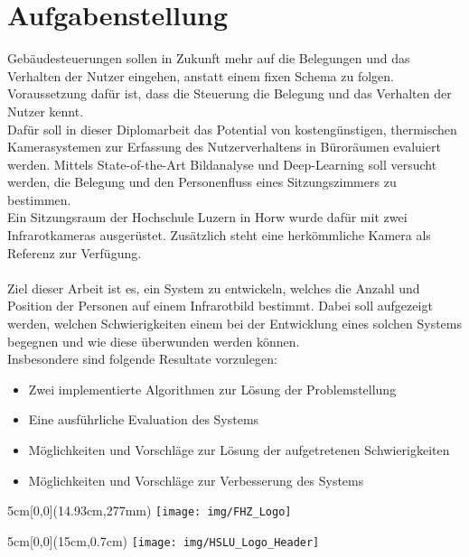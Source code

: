 \documentclass[
	a4paper
]{scrartcl}
\begin{document}
\section{Aufgabenstellung}
Gebäudesteuerungen sollen in Zukunft mehr auf die Belegungen und das Verhalten der Nutzer eingehen, anstatt einem fixen Schema zu folgen. Voraussetzung dafür ist, dass die Steuerung die Belegung und das Verhalten der Nutzer kennt.\\
Dafür soll in dieser Diplomarbeit das Potential von kostengünstigen, thermischen Kamerasystemen zur Erfassung des Nutzerverhaltens in Büroräumen evaluiert werden. Mittels State-of-the-Art Bildanalyse und Deep-Learning soll versucht werden, die Belegung und den Personenfluss eines Sitzungszimmers zu bestimmen.\\
Ein Sitzungsraum der Hochschule Luzern in Horw wurde dafür mit zwei Infrarotkameras ausgerüstet. Zusätzlich steht eine herkömmliche Kamera als Referenz zur Verfügung.\\
\\
Ziel dieser Arbeit ist es, ein System zu entwickeln, welches die Anzahl und Position der Personen auf einem Infrarotbild bestimmt. Dabei soll aufgezeigt werden, welchen Schwierigkeiten einem bei der Entwicklung eines solchen Systems begegnen und wie diese überwunden werden können.\\
Insbesondere sind folgende Resultate vorzulegen:
\begin{itemize}[]
	\item Zwei implementierte Algorithmen zur Lösung der Problemstellung
	\item Eine ausführliche Evaluation des Systems
	\item Möglichkeiten und Vorschläge zur Lösung der aufgetretenen Schwierigkeiten 
	\item  Möglichkeiten und Vorschläge zur Verbesserung des Systems
\end{itemize}

\vspace{0.5em}
\noindent
\begin{textblock*}{5cm}[0,0](14.93cm,277mm)
	\texttt{[image: img/FHZ\_Logo]}
\end{textblock*}

\newpage

\begin{textblock*}{5cm}[0,0](15cm,0.7cm)
	\texttt{[image: img/HSLU\_Logo\_Header]}
\end{textblock*}
\end{document}
